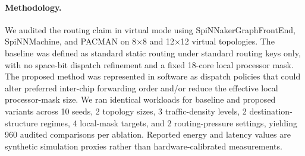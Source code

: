 \paragraph{Methodology.}
We audited the routing claim in virtual mode using SpiNNakerGraphFrontEnd, SpiNNMachine, and PACMAN on 8$\times$8 and 12$\times$12 virtual topologies. The baseline was defined as standard static routing under standard routing keys only, with no space-bit dispatch refinement and a fixed 18-core local processor mask. The proposed method was represented in software as dispatch policies that could alter preferred inter-chip forwarding order and/or reduce the effective local processor-mask size. We ran identical workloads for baseline and proposed variants across 10 seeds, 2 topology sizes, 3 traffic-density levels, 2 destination-structure regimes, 4 local-mask targets, and 2 routing-pressure settings, yielding 960 audited comparisons per ablation. Reported energy and latency values are synthetic simulation proxies rather than hardware-calibrated measurements.
